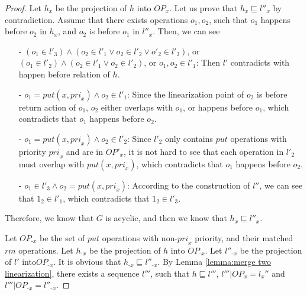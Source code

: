 \begin {proof}
Let $h_x$ be the projection of $h$ into $\textit{OP}_x$. Let us prove that $h_x \sqsubseteq l''_x$ by contradiction. Assume that there exists operations $o_1,o_2$, such that $o_1$ happens before $o_2$ in $h_x$, and $o_2$ is before $o_1$ in $l''_x$. Then, we can see

\begin{itemize}
\setlength{\itemsep}{0.5pt}
\item[-] $(o_1 \in l'_3) \wedge (o_2 \in l'_1 \vee o_2 \in l'_2 \vee o'_2 \in l'_3)$, or $(o_1 \in l'_2) \wedge (o_2 \in l'_1 \vee o_2 \in l'_2)$, or $o_1,o_2 \in l'_1$: Then $l'$ contradicts with happen before relation of $h$.

\item[-] $o_1 = \textit{put}(x,\textit{pri}_x) \wedge o_2 \in l'_1$: Since the linearization point of $o_2$ is before return action of $o_1$, $o_2$ either overlaps with $o_1$, or happens before $o_1$, which contradicts that $o_1$ happens before $o_2$.

\item[-] $o_1 = \textit{put}(x,\textit{pri}_x) \wedge o_2 \in l'_2$: Since $l'_2$ only contains $\textit{put}$ operations with priority $\textit{pri}_x$ and are in $\textit{OP}'_x$, it is not hard to see that each operation in $l'_2$ must overlap with $\textit{put}(x,\textit{pri}_x)$, which contradicts that $o_1$ happens before $o_2$.

\item[-] $o_1 \in l'_3 \wedge o_2 = \textit{put}(x,\textit{pri}_x)$: According to the construction of $l''$, we can see that $1_2 \in l'_1$, which contradicts that $1_2 \in l'_3$.
\end{itemize}

Therefore, we know that $G$ is acyclic, and then we know that $h_x \sqsubseteq l''_x$.

Let $\textit{OP}_{\textit{-x}}$ be the set of $\textit{put}$ operations with non-$\textit{pri}_x$ priority, and their matched $\textit{rm}$ operations. Let $h_{\textit{-x}}$ be the projection of $h$ into $\textit{OP}_{\textit{-x}}$. Let $l''_{\textit{-x}}$ be the projection of $l'$ into$\textit{OP}_{\textit{-x}}$. It is obvious that $h_{\textit{-x}} \sqsubseteq l''_{\textit{-x}}$. By Lemma \ref{lemma:merge two linearization}, there exists a sequence $l'''$, such that $h \sqsubseteq l'''$, $l''' \vert{\textit{OP}_x} = l_x''$ and $l''' \vert{\textit{OP}_{\textit{-x}}} = l''_{\textit{-x}}$.


\end{proof}
